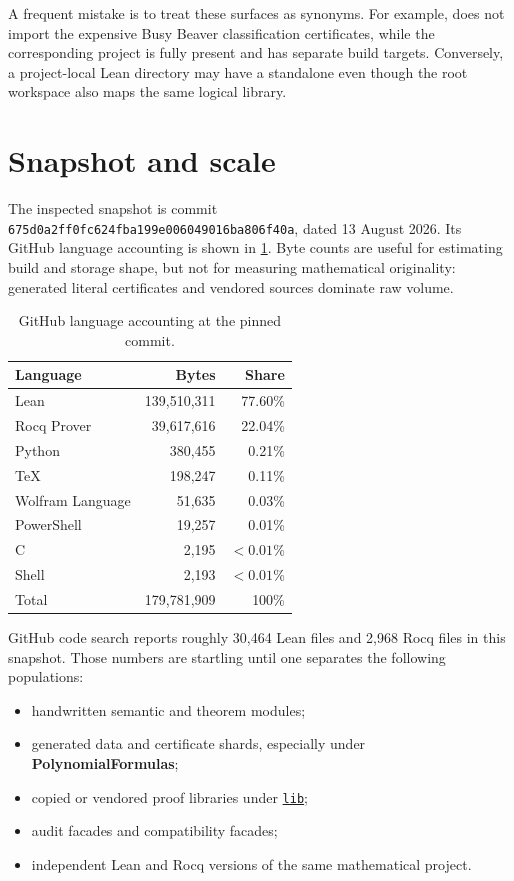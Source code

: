 \documentclass[
  10pt,
  a4paper,
  twoside,
  open=any,
  parskip=half,
  headings=big
]{scrreprt}
\newcommand{\CommitFull}{675d0a2ff0fc624fba199e006049016ba806f40a}
\newcommand{\SnapshotDate}{13 August 2026}
\newcommand{\RepoTreeBase}{https://github.com/VladimirReshetnikov/ProveIt/tree/\CommitFull/}
\newcommand{\RepoDir}[1]{%
  \href{\RepoTreeBase\detokenize{#1}}{\nolinkurl{#1}}}
\newcommand{\code}[1]{\texttt{\detokenize{#1}}}
\newcommand{\project}[1]{\textsf{\bfseries #1}}
\begin{document}
A frequent mistake is to treat these surfaces as synonyms.  For example,
\code{import ProveIt} does not import the expensive Busy Beaver classification
certificates, while the corresponding project is fully present and has
separate build targets.  Conversely, a project-local Lean directory may have a
standalone \code{lakefile.toml} even though the root workspace also maps the
same logical library.

\section{Snapshot and scale}

The inspected snapshot is commit
\texttt{\CommitFull}, dated \SnapshotDate.  Its GitHub language accounting is
shown in \cref{tab:languages}.  Byte counts are useful for estimating build and
storage shape, but not for measuring mathematical originality: generated
literal certificates and vendored sources dominate raw volume.

\begin{table}[htbp]
\centering
\caption{GitHub language accounting at the pinned commit.}
\label{tab:languages}
\begin{tabular}{lr r}
\toprule
Language & Bytes & Share \\
\midrule
Lean & 139,510,311 & 77.60\% \\
Rocq Prover & 39,617,616 & 22.04\% \\
Python & 380,455 & 0.21\% \\
\TeX & 198,247 & 0.11\% \\
Wolfram Language & 51,635 & 0.03\% \\
PowerShell & 19,257 & 0.01\% \\
C & 2,195 & $<0.01$\% \\
Shell & 2,193 & $<0.01$\% \\
\midrule
Total & 179,781,909 & 100\% \\
\bottomrule
\end{tabular}
\end{table}

GitHub code search reports roughly 30,464 Lean files and 2,968 Rocq
\code{.v} files in this snapshot.  Those numbers are startling until one
separates the following populations:

\begin{itemize}
  \item handwritten semantic and theorem modules;
  \item generated data and certificate shards, especially under
        \project{PolynomialFormulas};
  \item copied or vendored proof libraries under \RepoDir{lib};
  \item audit facades and compatibility facades;
  \item independent Lean and Rocq versions of the same mathematical project.
\end{itemize}
\end{document}
